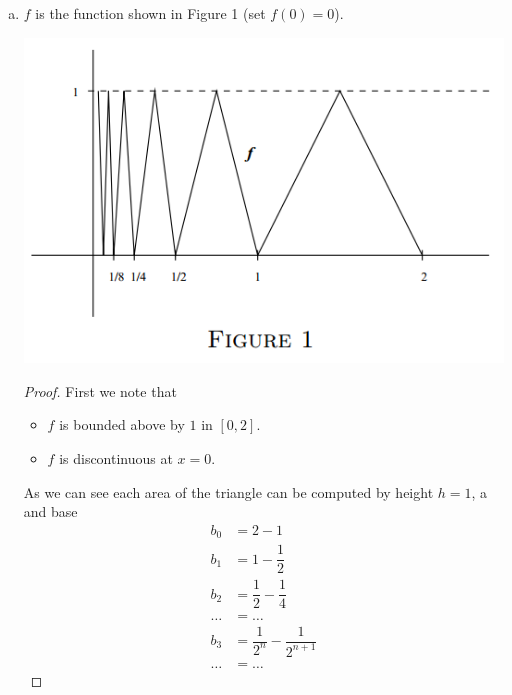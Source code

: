 \documentclass[10pt,letterpaper]{article}
\begin{document}
\begin{enumerate}[(a)]
		\item $f$ is the function shown in Figure 1 (set $f(0) = 0$).
		\begin{center}
			\includegraphics[scale=0.5]{hw9.png}
		\end{center}
		\begin{proof}
		First we note that
		\begin{itemize}
			\item $f$ is bounded above by $1$ in $[0, 2]$.
			\item $f$ is discontinuous at $x = 0$.
		\end{itemize}
		As we can see each area of the triangle can be computed by height $h = 1$, a
		and base
		\begin{align*}
			b_0 &= 2 - 1 \\
			b_1 &= 1 - \dfrac{1}{2} \\
			b_2 &= \dfrac{1}{2} - \dfrac{1}{4} \\
			\ldots &= \ldots \\
			b_3 &= \dfrac{1}{2^{n}} - \dfrac{1}{2^{n+1}} \\
			\ldots &= \ldots
		\end{align*}
		

\end{proof}
\end{enumerate}
\end{document}

